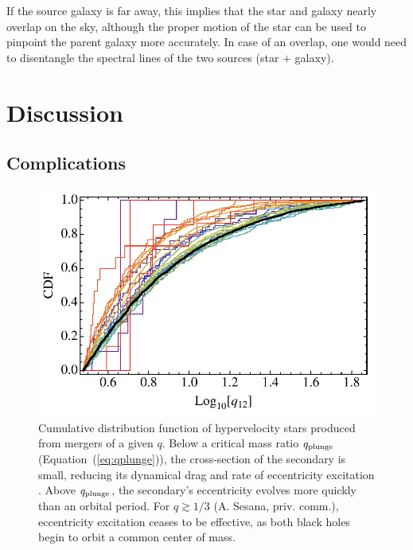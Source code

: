 \documentclass[a4paper,twocolumn]{emulateapj}
\begin{document}
If the source galaxy is far away, this implies that the star and
galaxy nearly overlap on the sky, although the proper motion of the
star can be used to pinpoint the parent galaxy more accurately. In
case of an overlap, one would need to disentangle the spectral lines
of the two sources (star $+$ galaxy).

\section{Discussion}
\subsection{Complications}
\begin{figure}
\centering\includegraphics[width=\linewidth,clip=true]{qcdf}
\caption{Cumulative distribution function of hypervelocity stars produced from mergers of a given $q$. Below a critical mass ratio $q_{\rm plunge}$ (Equation~(\ref{eq:qplunge})), the cross-section of the secondary is small, reducing its dynamical drag and rate of eccentricity excitation \citep{Iwasawa:2011a}. Above $q_{\rm plunge}$, the secondary's eccentricity evolves more quickly than an orbital period. For $q \gtrsim 1/3$ (A. Sesana, priv. comm.), eccentricity excitation ceases to be effective, as both black holes begin to orbit a common center of mass.}
\label{fig:qcdf}
\end{figure}
\end{document}
